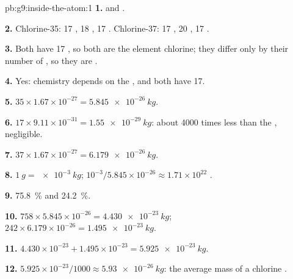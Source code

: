 \begin{solution}{pb:g9:inside-the-atom:1}
\textbf{1.}  and .

\textbf{2.} Chlorine-35: 17 , 18 , 17 .
Chlorine-37: 17 , 20 , 17 .

\textbf{3.} Both have 17 , so both are the element chlorine; they
differ only by their number of , so they are .

\textbf{4.} Yes: chemistry depends on the , and both have 17.

\textbf{5.} $35 \times 1.67 \times 10^{-27} = \qty{5.845e-26}{kg}$.

\textbf{6.} $17 \times 9.11 \times 10^{-31} = \qty{1.55e-29}{kg}$:
about 4000 times less than the , negligible.

\textbf{7.} $37 \times 1.67 \times 10^{-27} = \qty{6.179e-26}{kg}$.

\textbf{8.} $\qty{1}{g} = \qty{e-3}{kg}$; $10^{-3} / 5.845 \times
10^{-26} \approx 1.71 \times 10^{22}$ .

\textbf{9.} \qty{75.8}{\percent} and \qty{24.2}{\percent}.

\textbf{10.} $758 \times 5.845 \times 10^{-26} = \qty{4.430e-23}{kg}$;
$242 \times 6.179 \times 10^{-26} = \qty{1.495e-23}{kg}$.

\textbf{11.} $4.430 \times 10^{-23} + 1.495 \times 10^{-23} =
\qty{5.925e-23}{kg}$.

\textbf{12.} $5.925 \times 10^{-23} / 1000 \approx
\qty{5.93e-26}{kg}$: the average mass of a chlorine .
\end{solution}
